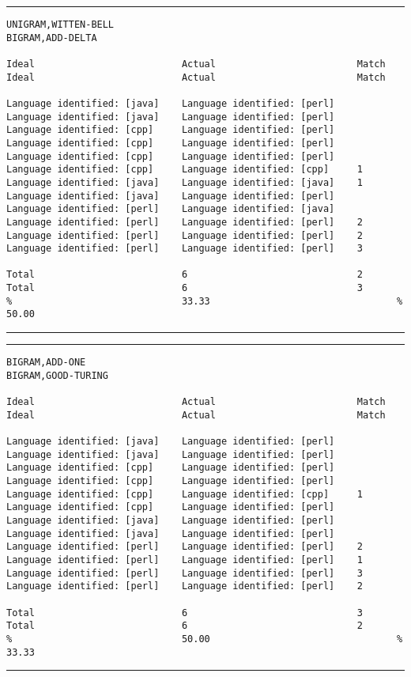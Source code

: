 \tiny
\hrule\vskip4pt
\begin{verbatim}
UNIGRAM,WITTEN-BELL                                                  BIGRAM,ADD-DELTA

Ideal                          Actual                         Match  Ideal                          Actual                         Match

Language identified: [java]    Language identified: [perl]           Language identified: [java]    Language identified: [perl]
Language identified: [cpp]     Language identified: [perl]           Language identified: [cpp]     Language identified: [perl]
Language identified: [cpp]     Language identified: [perl]           Language identified: [cpp]     Language identified: [cpp]     1
Language identified: [java]    Language identified: [java]    1      Language identified: [java]    Language identified: [perl]
Language identified: [perl]    Language identified: [java]           Language identified: [perl]    Language identified: [perl]    2
Language identified: [perl]    Language identified: [perl]    2      Language identified: [perl]    Language identified: [perl]    3

Total                          6                              2      Total                          6                              3
%                              33.33                                 %                              50.00
\end{verbatim}
\vskip4pt\hrule

\tiny
\hrule\vskip4pt
\begin{verbatim}
BIGRAM,ADD-ONE                                                       BIGRAM,GOOD-TURING

Ideal                          Actual                         Match  Ideal                          Actual                         Match

Language identified: [java]    Language identified: [perl]           Language identified: [java]    Language identified: [perl]
Language identified: [cpp]     Language identified: [perl]           Language identified: [cpp]     Language identified: [perl]
Language identified: [cpp]     Language identified: [cpp]     1      Language identified: [cpp]     Language identified: [perl]
Language identified: [java]    Language identified: [perl]           Language identified: [java]    Language identified: [perl]
Language identified: [perl]    Language identified: [perl]    2      Language identified: [perl]    Language identified: [perl]    1
Language identified: [perl]    Language identified: [perl]    3      Language identified: [perl]    Language identified: [perl]    2

Total                          6                              3      Total                          6                              2
%                              50.00                                 %                              33.33
\end{verbatim}
\vskip4pt\hrule

